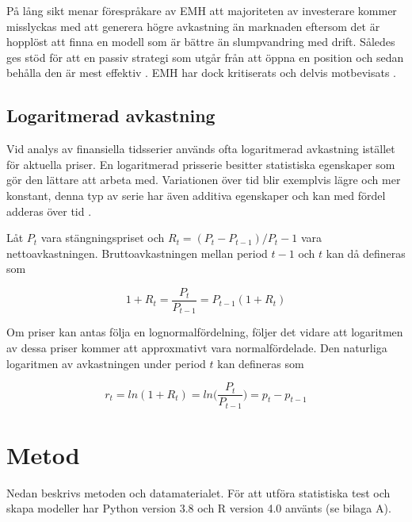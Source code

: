 \documentclass[11pt]{article}
\numberwithin{equation}{section}
\numberwithin{table}{section}
\numberwithin{figure}{section}
\begin{document}
På lång sikt menar förespråkare av EMH att majoriteten av investerare kommer misslyckas med att generera högre avkastning än marknaden eftersom det är hopplöst att finna en modell som är bättre än slumpvandring med drift. Således ges stöd för att en passiv strategi som utgår från att öppna en position och sedan behålla den är mest effektiv \parencite{EMHforecast}. EMH har dock kritiserats och delvis motbevisats \parencite{basu1977investment, ball1978anomalies}.

\subsection{Logaritmerad avkastning}

Vid analys av finansiella tidsserier används ofta logaritmerad avkastning istället för aktuella priser. En logaritmerad prisserie besitter statistiska egenskaper som gör den lättare att arbeta med. Variationen över tid blir exemplvis lägre och mer konstant, denna typ av serie har även additiva egenskaper och kan med fördel adderas över tid \parencite{tsay}.

Låt \(P_t\) vara stängningspriset och $R_{t}= (P_{t} - P_{t-1}) / {P_t-1}$ vara nettoavkastningen. Bruttoavkastningen mellan period $t-1$ och $t$ kan då defineras som

\begin{equation}
    1+R_{t} = \frac{P_{t}}{P_{t-1}} = P_{t-1}(1+R_{t})
\end{equation}

Om priser kan antas följa en lognormalfördelning, följer det vidare att logaritmen av dessa priser kommer att approxmativt vara normalfördelade. Den naturliga logaritmen av avkastningen under period $t$ kan defineras som

\begin{equation}
    r_{t}=ln(1 + R_{t})=ln\Big(\frac{P_{t}}{P_{t-1}}\Big)=p_{t}-p_{t-1}
\end{equation}










\newpage
\section{Metod}
Nedan beskrivs metoden och datamaterialet. För att utföra statistiska test och skapa modeller har Python version 3.8 och R version 4.0 använts (se bilaga A). 
\end{document}
